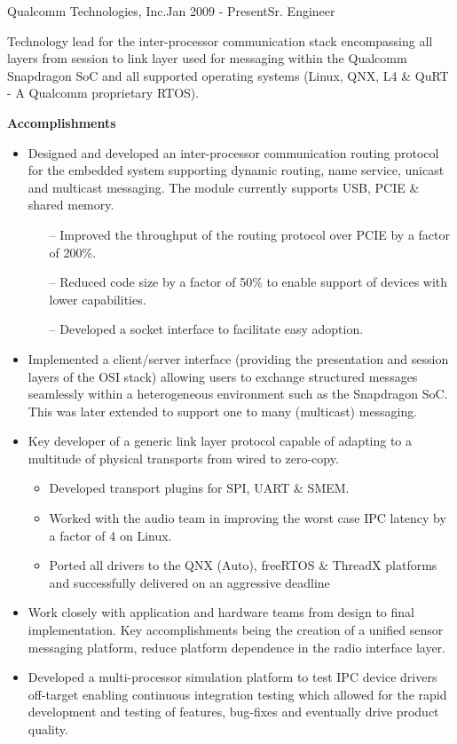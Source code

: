 \begin{rSubsection}{Qualcomm Technologies, Inc.}{Jan 2009 - Present}{Sr. Engineer}{}
  \item[] Technology lead for the inter-processor communication stack encompassing all layers from session to link layer used for messaging within the Qualcomm Snapdragon SoC and all supported operating systems (Linux, QNX, L4 \& QuRT - A Qualcomm proprietary RTOS).
  \item[]
  \item[] \textbf{Accomplishments}
  \begin{itemize}
    \item Designed and developed an inter-processor communication routing protocol for the embedded system supporting dynamic routing, name service, unicast and multicast messaging. The module currently supports USB, PCIE \& shared memory.
    \begin{itemize}
      \item[--] Improved the throughput of the routing protocol over PCIE by a factor of 200\%.
      \item[--] Reduced code size by a factor of 50\% to enable support of devices with lower capabilities.
      \item[--] Developed a socket interface to facilitate easy adoption.
    \end{itemize}
    \item Implemented a client/server interface (providing the presentation and session layers of the OSI stack) allowing users to exchange structured messages seamlessly within a heterogeneous environment such as the Snapdragon SoC. This was later extended to support one to many (multicast) messaging.
    \item Key developer of a generic link layer protocol capable of adapting to a multitude of physical transports from wired to zero-copy.
    \begin{itemize}
     \item Developed transport plugins for SPI, UART \& SMEM.
     \item Worked with the audio team in improving the worst case IPC latency by a factor of 4 on Linux.
     \item Ported all drivers to the QNX (Auto), freeRTOS \& ThreadX platforms and successfully delivered on an aggressive deadline
    \end{itemize}
    \item Work closely with application and hardware teams from design to final implementation. Key accomplishments being the creation of a unified sensor messaging platform, reduce platform dependence in the radio interface layer.
    \item Developed a multi-processor simulation platform to test IPC device drivers off-target enabling continuous integration testing which allowed for the rapid development and testing of features, bug-fixes and eventually drive product quality.
  \end{itemize}
\end{rSubsection}

